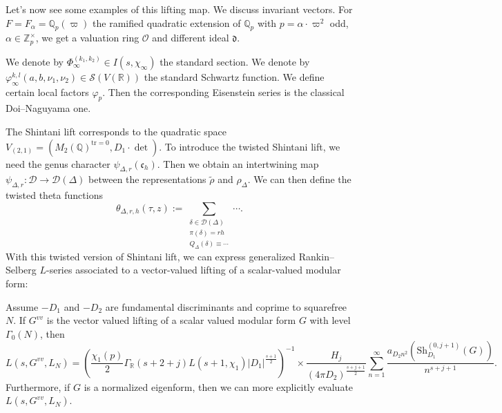 \documentclass[reqno]{amsart} 
\begin{document}
Let's now see some examples of this lifting map.  We discuss invariant vectors.  For $F = F_\alpha = \mathbb{Q}_p(\varpi)$ the ramified quadratic extension of $\mathbb{Q}_p$ with $p = \alpha \cdot \varpi^2$ odd, $\alpha \in \mathbb{Z}_p^\times$, we get a valuation ring $\mathcal{O}$ and different ideal $\mathfrak{d}$.

We denote by $\Phi_\infty^{(k_1, k_2)} \in I(s, \chi_\infty)$ the standard section.  We denote by $\varphi_\infty^{k, l}(a, b, \nu_1, \nu_2) \in \mathcal{S}(V(\mathbb{R}))$ the standard Schwartz function.  We define certain local factors $\varphi_p$.  Then the corresponding Eisenstein series is the classical Doi--Naguyama one.

The Shintani lift corresponds to the quadratic space $V_{(2, 1)} =(M_2(\mathbb{Q})^{\mathrm{tr}=0}, D_1 \cdot \det)$.  To introduce the twisted Shintani lift, we need the genus character $\psi_{\Delta, r}(\mathfrak{c}_h)$.  Then we obtain an intertwining map $\psi_{\Delta, r} : \mathcal{D} \rightarrow \mathcal{D}(\Delta)$ between the representations $\tilde{\rho}$ and $\rho_{\Delta}$.  We can then define the twisted theta functions
\begin{equation*}
  \theta_{\Delta, r, h}(\tau, z) := \sum_{
    \substack{
      \delta \in \mathcal{D}(\Delta)  \\
      \pi(\delta) = r h \\
      Q_\Delta(\delta) \equiv \dotsb
    }
  }
  \dotsb.
\end{equation*}
With this twisted version of Shintani lift, we can express generalized Rankin--Selberg $L$-series associated to a vector-valued lifting of a scalar-valued modular form:
\begin{theorem}
  Assume $- D_1$ and $- D_2$ are fundamental discriminants and coprime to squarefree $N$.  If $G^{v v}$ is the vector valued lifting of a scalar valued modular form $G$ with level $\Gamma_0(N)$, then
  \begin{equation*}
    L(s, G^{vv}, L_N) =
    \left( \frac{\chi_1(p)}{2}
      \Gamma_{\mathbb{R}}(s + 2 + j)
      L(s + 1, \chi_1)
      \lvert D_1 \rvert^{\frac{s + 1}{2}}
    \right)^{-1}
    \times
    \frac{H_j}{(4 \pi D_2)^{\frac{s + j + 1}{2}}}
    \sum_{n = 1}^\infty
    \frac{a_{D_2 n^2}(\mathrm{Sh}_{D_1}^{(0, j + 1)}(G))}{ n^{s + j + 1}}.
  \end{equation*}
  Furthermore, if $G$ is a normalized eigenform, then we can more explicitly evaluate $L(s, G^{vv}, L_N)$.
\end{theorem}
\end{document}
